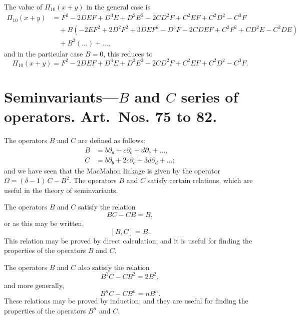 \documentclass[11pt,a4paper]{book}
\begin{document}
{{{\setcounter{art}{74}
\begin{art}
The value of $\Pi_{10}(x + y)$ in the general case is
\begin{align*}
\Pi_{10}(x + y) &= F^{2} - 2DEF + D^{3}E + D^{2}E^{2} - 2CD^{2}F + C^{2}EF + C^{2}D^{2} - C^{3}F\\
&\quad + B(-2EF^{2} + 2D^{2}F^{2} + 3DEF^{2} - D^{3}F - 2CDEF + C^{2}F^{2} + CD^{2}E - C^{2}DE)\\
&\quad + B^{2}(\ldots) + \ldots,
\end{align*}
and in the particular case $B = 0$, this reduces to
\[
\Pi_{10}(x + y) = F^{2} - 2DEF + D^{3}E + D^{2}E^{2} - 2CD^{2}F + C^{2}EF + C^{2}D^{2} - C^{3}F.
\]
\end{art}

\section*{Seminvariants---$B$ and $C$ series of operators. Art.~Nos. \textbf{75} to \textbf{82}.}

\setcounter{art}{74}
\begin{art}
The operators $B$ and $C$ are defined as follows:
\begin{align*}
B &= b\partial_{a} + c\partial_{b} + d\partial_{c} + \ldots,\\
C &= b\partial_{b} + 2c\partial_{c} + 3d\partial_{d} + \ldots;
\end{align*}
and we have seen that the MacMahon linkage is given by the operator $\Omega = (\delta - 1)\,C - B^{2}$. The operators $B$ and $C$ satisfy certain relations, which are useful in the theory of seminvariants.
\end{art}

\setcounter{art}{75}
\begin{art}
The operators $B$ and $C$ satisfy the relation
\[
BC - CB = B,
\]
or as this may be written,
\[
[B, C] = B.
\]
This relation may be proved by direct calculation; and it is useful for finding the properties of the operators $B$ and $C$.
\end{art}

\setcounter{art}{76}
\begin{art}
The operators $B$ and $C$ also satisfy the relation
\[
B^{2}C - CB^{2} = 2B^{2},
\]
and more generally,
\[
B^{n}C - CB^{n} = nB^{n}.
\]
These relations may be proved by induction; and they are useful for finding the properties of the operators $B^{n}$ and $C$.
\end{art}

}}}
\end{document}
